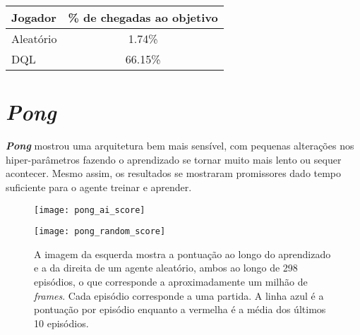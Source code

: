 \begin{center}
\begin{tabular}{l c}
\hline
Jogador & \% de chegadas ao objetivo \\
\hline
Aleatório & 1.74\% \\
DQL & 66.15\% \\
\hline
\end{tabular}
\label{table:gridworld_score}
\end{center}

\section{\textit{Pong}}
\label{sec:res_pong}

\textbf{\textit{Pong}} mostrou uma arquitetura bem mais sensível, com pequenas alterações nos hiper-parâmetros fazendo o aprendizado se tornar muito mais lento ou sequer acontecer.
Mesmo assim, os resultados se mostraram promissores dado tempo suficiente para o agente treinar e aprender.


\begin{figure}[h!]
  \begin{minipage}[b]{.5\textwidth}
  \centering
  \texttt{[image: pong\_ai\_score]}
  \end{minipage}
  \hfill
  \begin{minipage}[b]{.5\textwidth}
  \centering
  \texttt{[image: pong\_random\_score]}
  \end{minipage}
  \caption{A imagem da esquerda mostra a pontuação ao longo do aprendizado e a da direita de um agente aleatório, ambos ao longo de 298 episódios, o que corresponde a aproximadamente um milhão de \textit{frames}. Cada episódio corresponde a uma partida. A linha azul é a pontuação por episódio enquanto a vermelha é a média dos últimos 10 episódios.}
  \label{fig:pong_score}
\end{figure}


